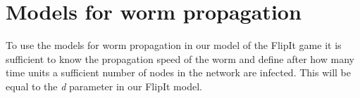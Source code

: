 \begin{description}
\end{description}

 

\section{Models for worm propagation}
\label{modelsforpropagation}
To use the models for worm propagation in our model of the FlipIt game it is sufficient to know the propagation speed of the worm and define after how many time units a sufficient number of nodes in the network are infected. This will be equal to the \textit{d} parameter in our FlipIt model. \\


